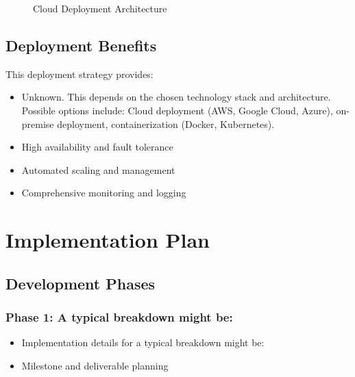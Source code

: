 \documentclass[11pt,a4paper,oneside]{article}
\begin{document}
\begin{figure}[H]
\caption{Cloud Deployment Architecture}
\label{fig:deployment}
\end{figure}


\subsection{Deployment Benefits}

This deployment strategy provides:
\begin{itemize}
\item Unknown. This depends on the chosen technology stack and architecture. Possible options include: Cloud deployment (AWS, Google Cloud, Azure), on-premise deployment, containerization (Docker, Kubernetes).
\item High availability and fault tolerance
\item Automated scaling and management
\item Comprehensive monitoring and logging
\end{itemize}

\section{Implementation Plan}

\subsection{Development Phases}

\subsubsection{Phase 1: A typical breakdown might be:}
\begin{itemize}
\item Implementation details for a typical breakdown might be:
\item Milestone and deliverable planning
\end{itemize}
\end{document}
